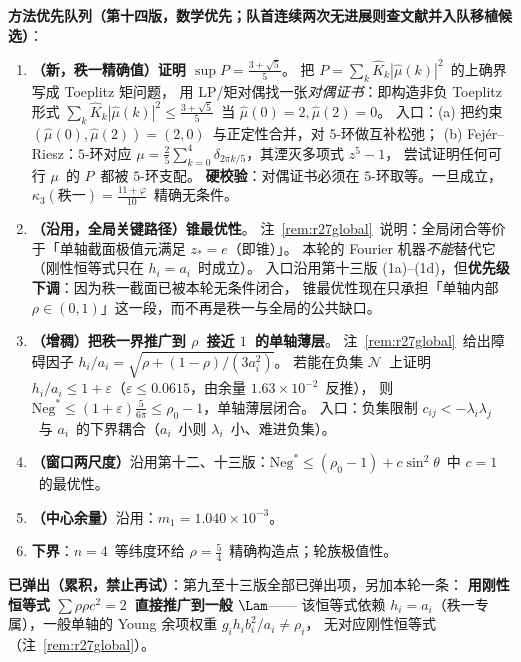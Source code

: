 \textbf{方法优先队列（第十四版，数学优先；队首连续两次无进展则查文献并入队移植候选）}：
\begin{enumerate}\itemsep=2pt
\item[\textbf{P1$'$}]\textbf{（新，秩一精确值）证明 $\sup P=\frac{3+\sqrt5}5$}。
把 $P=\sum_k\widehat K_k|\widehat\mu(k)|^2$~的上确界写成 Toeplitz 矩问题，
用 LP/矩对偶找一张\emph{对偶证书}：即构造非负 Toeplitz 形式
$\sum_k\widehat K_k|\widehat\mu(k)|^2\le\frac{3+\sqrt5}5$~当 $\widehat\mu(0)=2,\widehat\mu(2)=0$。
入口：(a) 把约束 $(\widehat\mu(0),\widehat\mu(2))=(2,0)$~与正定性合并，对 $5$-环做互补松弛；
(b) Fej\'er--Riesz：$5$-环对应 $\mu=\frac25\sum_{k=0}^4\delta_{2\pi k/5}$，其湮灭多项式 $z^5-1$，
尝试证明任何可行 $\mu$~的 $P$~都被 $5$-环支配。
\textbf{硬校验}：对偶证书必须在 $5$-环取等。一旦成立，$\kappa_3(\text{秩一})=\frac{11+\varphi}{10}$~精确无条件。
\item[\textbf{P1}]\textbf{（沿用，全局关键路径）锥最优性}。
注~\ref{rem:r27global}~说明：全局闭合等价于「单轴截面极值元满足 $z_*=e$（即锥）」。
本轮的 Fourier 机器\emph{不能}替代它（刚性恒等式只在 $h_i=a_i$~时成立）。
入口沿用第十三版 (1a)--(1d)，但\textbf{优先级下调}：因为秩一截面已被本轮无条件闭合，
锥最优性现在只承担「单轴内部 $\rho\in(0,1)$」这一段，而不再是秩一与全局的公共缺口。
\item[\textbf{P2}]\textbf{（增稠）把秩一界推广到 $\rho$~接近 $1$~的单轴薄层}。
注~\ref{rem:r27global}~给出障碍因子 $h_i/a_i=\sqrt{\rho+(1-\rho)/(3a_i^2)}$。
若能在负集 $\mathcal N$~上证明 $h_i/a_i\le1+\varepsilon$（$\varepsilon\le0.0615$，由余量 $1.63\times10^{-2}$~反推），
则 $\mathrm{Neg}^*\le(1+\varepsilon)\frac5{6\pi}\le\rho_0-1$，单轴薄层闭合。
入口：负集限制 $c_{ij}<-\lambda_i\lambda_j$~与 $a_i$~的下界耦合（$a_i$~小则 $\lambda_i$~小、难进负集）。
\item[\textbf{P3}]\textbf{（窗口两尺度）}沿用第十二、十三版：$\mathrm{Neg}^*\le(\rho_0-1)+c\sin^2\theta$~中 $c=1$~的最优性。
\item[\textbf{P4}]\textbf{（中心余量）}沿用：$m_1=1.040\times10^{-3}$。
\item[\textbf{副}]\textbf{下界}：$n=4$~等纬度环给 $\rho=\frac54$~精确构造点；轮族极值性。
\end{enumerate}

\textbf{已弹出（累积，禁止再试）}：第九至十三版全部已弹出项，另加本轮一条：
\textbf{用刚性恒等式 $\sum\rho\rho c^2=2$~直接推广到一般 $\Lam$}——
该恒等式依赖 $h_i=a_i$（秩一专属），一般单轴的 Young 余项权重 $g_ih_ib_i^2/a_i\ne\rho_i$，
无对应刚性恒等式（注~\ref{rem:r27global}）。

